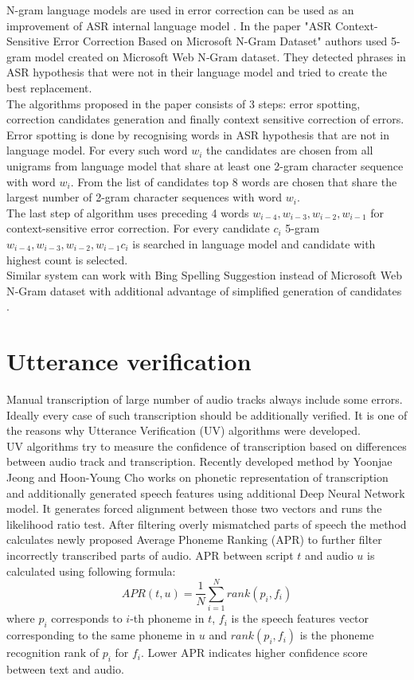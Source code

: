 \documentclass[a4paper,11pt,twoside]{report}
\theoremstyle{definition}
\begin{document}
N-gram language models are used in error correction can be used as an improvement of ASR internal language model \cite{ErrNGram}. In the paper "ASR Context-Sensitive Error Correction Based on Microsoft N-Gram Dataset" authors used 5-gram model created on Microsoft Web N‐Gram dataset. They detected phrases in ASR hypothesis that were not in their language model and tried to create the best replacement. \\
The algorithms proposed in the paper consists of 3 steps: error spotting, correction candidates generation and finally context sensitive correction of errors.\\
Error spotting is done by recognising words in ASR hypothesis that are not in language model. For every such word $w_i$ the candidates are chosen from all unigrams from language model that share at least one 2-gram character sequence with  word $w_i$. From the list of candidates top 8 words are chosen that share the largest number of 2-gram character sequences with word $w_i$.\\
The last step of algorithm uses preceding 4 words $w_{i-4}, w_{i-3}, w_{i-2}, w_{i-1}$ for context-sensitive error correction. For every candidate $c_i$ 5-gram $w_{i-4}, w_{i-3}, w_{i-2}, w_{i-1} c_i$ is searched in language model and candidate with highest count is selected.\\
Similar system can work with Bing Spelling Suggestion instead of Microsoft Web N‐Gram dataset with additional advantage of simplified generation of candidates \cite{ErrBing}.

\section{Utterance verification}

Manual transcription of large number of audio tracks always include some errors. Ideally every case of such transcription should be additionally verified. It is one of the reasons why Utterance Verification (UV) algorithms were developed. \\

UV algorithms try to measure the confidence of transcription based on differences between audio track and transcription. Recently developed method by Yoonjae Jeong and Hoon-Young Cho \cite{UVPhonemeRanking} works on phonetic representation of transcription and additionally generated speech features using additional Deep Neural Network model. It generates forced alignment between those two vectors and runs the likelihood
ratio test. After filtering overly mismatched parts of speech the method calculates newly proposed Average Phoneme Ranking (APR) to further filter incorrectly transcribed parts of audio. APR between script $t$ and audio $u$ is calculated using following formula:
$$
APR(t,u) = \frac{1}{N}\sum_{i=1}^N rank(p_i, f_i)
$$
where $p_i$ corresponds to $i$-th phoneme in $t$, $f_i$ is the speech features vector corresponding to the same phoneme in $u$ and $rank(p_i, f_i)$ is the phoneme recognition rank of $p_i$ for $f_i$. Lower APR indicates higher confidence score between text and audio. \\
\end{document}
